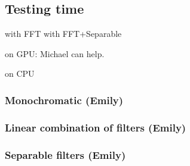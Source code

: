 \documentclass{article}
\begin{document}
\subsection{Testing time}

with FFT
with FFT+Separable

on GPU: Michael can help.

on CPU


\subsubsection{Monochromatic (Emily)}

\subsubsection{Linear combination of filters (Emily)}

\subsubsection{Separable filters (Emily)}
\end{document}
